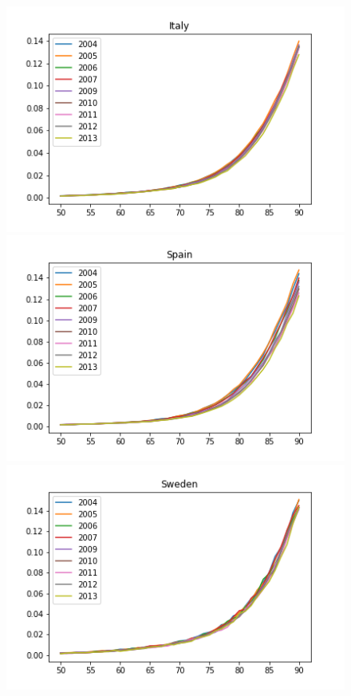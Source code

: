 \begin{figure}[H]
\endminipage\hfill
{}%
  \includegraphics[width=\linewidth]{images/mortality_female_6.png}
\endminipage\hfill
{}
  \includegraphics[width=\linewidth]{images/mortality_female_7.png}
\endminipage\hfill
{}
  \includegraphics[width=\linewidth]{images/mortality_female_8.png}

\end{figure}
